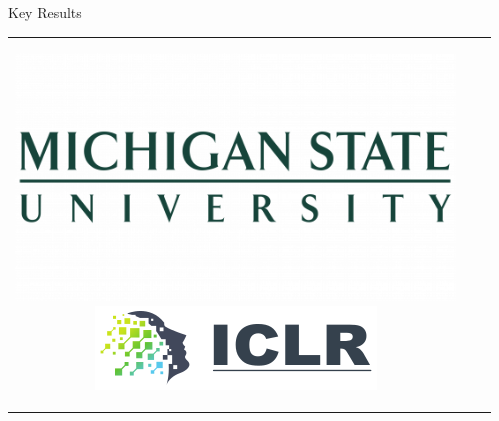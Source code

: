 \documentclass[final]{beamer}
\newlength{\sepwid}
\newlength{\onecolwid}
\begin{document}
\begin{frame}[t]
\begin{columns}[t]
\begin{column}{\onecolwid}
\begin{block}{Key Results}
\begin{center}
\begin{tabular}{ccc}
{                            }
                            \hspace{0.03\linewidth}
                            \parbox[c][3.5in][c]{0.3\linewidth}{
                                \includegraphics[width=\linewidth]{figs/MSU.png}\\[1ex]
                                \includegraphics[width=\linewidth]{figs/ICLR-logo.png}
                            }
                        \end{tabular}
                    \end{center}

                \end{block}





            \end{column} %

            \begin{column}{\sepwid}\end{column} %

        \end{columns} %

    \end{frame} %
\end{document}
